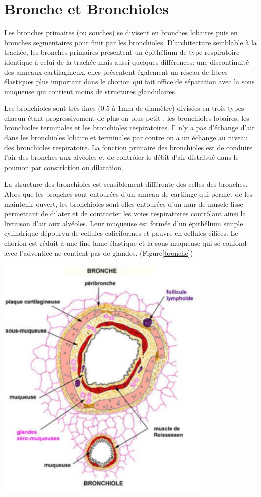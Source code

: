 		\section{Bronche et Bronchioles}
Les bronches primaires (ou souches) se divisent en bronches lobaires puis en bronches segmentaires pour finir par les bronchioles. D’architecture semblable à la trachée, les bronches primaires présentent un épithélium de type respiratoire identique à celui de la trachée mais aussi quelques différences: une discontinuité des anneaux cartilagineux, elles présentent également un réseau de fibres élastiques plus important dans le chorion qui fait office de séparation avec la sous muqueuse qui contient moins de structures glandulaires.

Les bronchioles sont très fines (0.5 à 1mm de diamètre) divisées en trois types chacun étant progressivement de plus en plus petit : les bronchioles lobaires, les bronchioles terminales et les bronchioles respiratoires. Il n’y a pas d’échange d’air dans les bronchioles lobaire et terminales par contre on a un échange au niveau des bronchioles respiratoire. La fonction primaire des bronchioles est de conduire l’air des bronches aux alvéoles et de contrôler le débit d’air distribué dans le poumon par constriction ou dilatation. 

La structure des bronchioles est sensiblement différente des celles des bronches. Alors que les bronches sont entourées d’un anneau de cartilage qui permet de les maintenir ouvert, les bronchioles sont-elles entourées d’un mur de muscle lisse permettant de dilater et de contracter les voies respiratoires contrôlant ainsi la livraison d’air aux alvéoles. Leur muqueuse est formée d’un épithélium simple cylindrique dépourvu de cellules caliciformes et pauvre en cellules ciliées. Le chorion est réduit à une fine lame élastique et la sous muqueuse qui se confond avec l’adventice ne contient pas de glandes. (Figure\ref{bronche})

\begin{center}
\includegraphics[scale=1.6]{gfx/bronche.jpg} 
\captionsetup{type=figure}
       \label{bronche}
\end{center}



